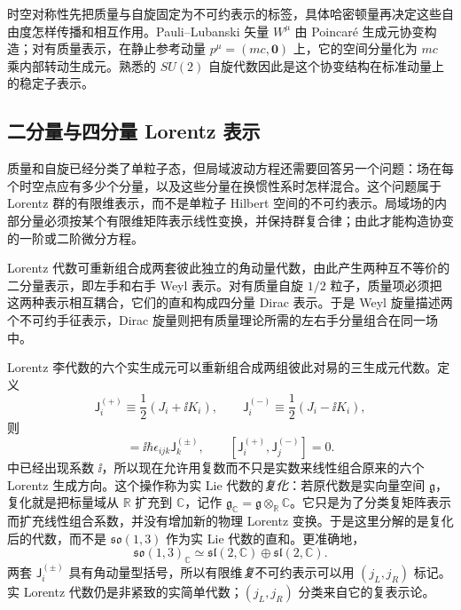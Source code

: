 时空对称性先把质量与自旋固定为不可约表示的标签，具体哈密顿量再决定这些自由度怎样传播和相互作用。Pauli--Lubanski 矢量 $W^\mu$ 由 Poincar\'e 生成元协变构造；对有质量表示，在静止参考动量 $p^\mu=(mc,\mathbf0)$ 上，它的空间分量化为 $mc$ 乘内部转动生成元。熟悉的 $SU(2)$ 自旋代数因此是这个协变结构在标准动量上的稳定子表示。



\subsection{二分量与四分量 Lorentz 表示}\label{sec:feqo-dirac-from-dispersion}

质量和自旋已经分类了单粒子态，但局域波动方程还需要回答另一个问题：场在每个时空点应有多少个分量，以及这些分量在换惯性系时怎样混合。这个问题属于 Lorentz 群的有限维表示，而不是单粒子 Hilbert 空间的不可约表示。局域场的内部分量必须按某个有限维矩阵表示线性变换，并保持群复合律；由此才能构造协变的一阶或二阶微分方程。

Lorentz 代数可重新组合成两套彼此独立的角动量代数，由此产生两种互不等价的二分量表示，即左手和右手 Weyl 表示。对有质量自旋 $1/2$ 粒子，质量项必须把这两种表示相互耦合，它们的直和构成四分量 Dirac 表示。于是 Weyl 旋量描述两个不可约手征表示，Dirac 旋量则把有质量理论所需的左右手分量组合在同一场中。



Lorentz 李代数的六个实生成元可以重新组合成两组彼此对易的三生成元代数。定义
\begin{equation}
 \mathsf J_i^{(+)}\equiv\frac12(J_i+\ii K_i),
 \qquad
 \mathsf J_i^{(-)}\equiv\frac12(J_i-\ii K_i),
 \label{eq:lorentz-su2-generators-r15}
\end{equation}
则
\begin{equation}
 [\mathsf J_i^{(\pm)},\mathsf J_j^{(\pm)}]
 =\ii\hbar\epsilon_{ijk}\mathsf J_k^{(\pm)},
 \qquad
 [\mathsf J_i^{(+)},\mathsf J_j^{(-)}]=0.
 \label{eq:lorentz-su2-algebra-dp34}
\end{equation}
 中已经出现系数 $\ii$，所以现在允许用复数而不只是实数来线性组合原来的六个 Lorentz 生成方向。这个操作称为实 Lie 代数的\emph{复化}：若原代数是实向量空间 $\mathfrak g$，复化就是把标量域从 $\mathbb R$ 扩充到 $\mathbb C$，记作 $\mathfrak g_{\mathbb C}=\mathfrak g\otimes_{\mathbb R}\mathbb C$。它只是为了分类复矩阵表示而扩充线性组合系数，并没有增加新的物理 Lorentz 变换。于是这里分解的是复化后的代数，而不是 $\mathfrak{so}(1,3)$ 作为实 Lie 代数的直和。更准确地，
\begin{equation}
 {
 \mathfrak{so}(1,3)_\mathbb C
 \simeq
 \mathfrak{sl}(2,\mathbb C)\oplus\mathfrak{sl}(2,\mathbb C).}
 \label{eq:lorentz-complexified-decomposition-dp75}
\end{equation}
两套 $\mathsf J_i^{(\pm)}$ 具有角动量型括号，所以有限维\emph{复}不可约表示可以用 $(j_L,j_R)$ 标记。实 Lorentz 代数仍是非紧致的实简单代数；$(j_L,j_R)$ 分类来自它的复表示论。

